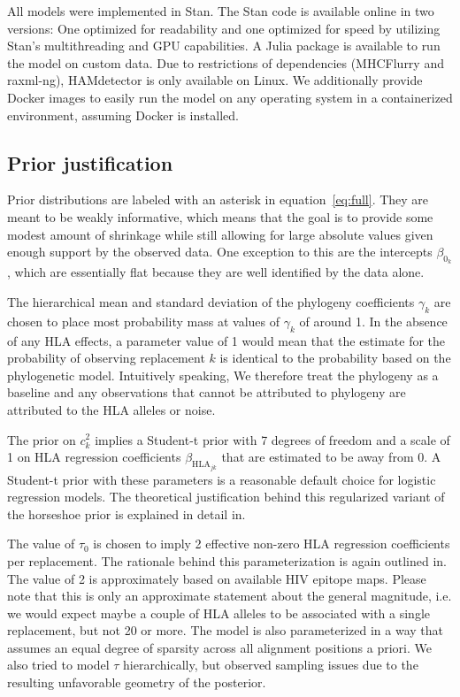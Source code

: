 \documentclass[fleqn,11pt]{SelfArx} %
\begin{document}
All models were implemented in Stan. The Stan code is available online in two versions: One optimized for readability and one optimized for speed by utilizing Stan's multithreading and GPU capabilities.
A Julia\cite{Bezanson2017} package is available to run the model on custom data. Due to restrictions of dependencies (MHCFlurry and raxml-ng), HAMdetector is only available on Linux. We additionally provide Docker images to easily run the model on any operating system in a containerized environment, assuming Docker is installed. 

\subsection*{Prior justification}

Prior distributions are labeled with an asterisk in equation~\ref{eq:full}. They are meant to be weakly informative, which means that the goal is to provide some modest amount of shrinkage while still allowing for large absolute values given enough support by the observed data. One exception to this are the intercepts \(\beta_{0_k}\), which are essentially flat because they are well identified by the data alone.

The hierarchical mean and standard deviation of the phylogeny coefficients \(\gamma_{k}\) are chosen to place most probability mass at values of \(\gamma_{k}\) of around 1. In the absence of any HLA effects, a parameter value of 1 would mean that the estimate for the probability of observing replacement \(k\) is identical to the probability based on the phylogenetic model. Intuitively speaking, We therefore treat the phylogeny as a baseline and any observations that cannot be attributed to phylogeny are attributed to the HLA alleles or noise.

The prior on \(c_{k}^{2}\) implies a Student-t prior with 7 degrees of freedom and a scale of 1 on HLA regression coefficients \(\beta_{\text{HLA}_{jk}}\) that are estimated to be away from 0. A Student-t prior with these parameters is a reasonable default choice for logistic regression models. The theoretical justification behind this regularized variant of the horseshoe prior is explained in detail in\cite{Piironen2017}.

The value of \(\tau_{0}\) is chosen to imply 2 effective non-zero HLA regression coefficients per replacement. The rationale behind this parameterization is again outlined in\cite{Piironen2017}. The value of 2 is approximately based on available HIV epitope maps. Please note that this is only an approximate statement about the general magnitude, i.e. we would expect maybe a couple of HLA alleles to be associated with a single replacement, but not 20 or more.
The model is also parameterized in a way that assumes an equal degree of sparsity across all alignment positions a priori. We also tried to model \(\tau\) hierarchically, but observed sampling issues due to the resulting unfavorable geometry of the posterior.
\end{document}
